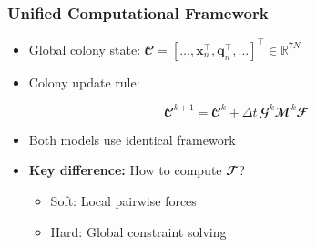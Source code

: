 \documentclass[
	10pt,
	t
]{beamer}
\begin{document}
\begin{frame}
    \frametitle{Unified Computational Framework}

    \begin{itemize}
        \item Global colony state: $\mathbfcal{C} = [\dots, \mathbf{x}_n^\top, \mathbf{q}_n^\top, \dots]^\top \in \mathbb{R}^{7N}$
        \item Colony update rule:
    \end{itemize}

    \begin{equation*}
        \mathbfcal{C}^{k+1} = \mathbfcal{C}^k + \Delta t \, \mathbfcal{G}^k \mathbfcal{M}^k \mathbfcal{F}
    \end{equation*}

    \begin{itemize}
        \item Both models use identical framework
        \item \textbf{Key difference:} How to compute $\mathbfcal{F}$?
              \begin{itemize}
                  \item Soft: Local pairwise forces
                  \item Hard: Global constraint solving
              \end{itemize}
    \end{itemize}

\end{frame}
\end{document}

